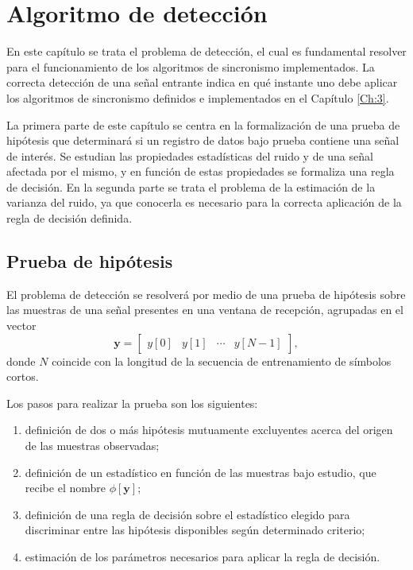\chapter{Algoritmo de detección}
\label{Ch:4}
\graphicspath{{figs/}}

En este capítulo se trata el problema de detección, el cual es fundamental resolver para el funcionamiento de los algoritmos de sincronismo implementados. La correcta detección de una señal entrante indica en qué instante uno debe \color{Green} aplicar \color{black} los algoritmos de sincronismo definidos e implementados en el Capítulo \ref{Ch:3}. 

La primera parte de este capítulo se centra en la formalización de una prueba de hipótesis que determinará si un registro de datos bajo prueba contiene una señal de interés. Se estudian las propiedades estadísticas del ruido y de una señal afectada por el mismo, y en función de estas propiedades se formaliza una regla de decisión. En la segunda parte se trata el problema de la estimación de la varianza del ruido, ya que conocerla es necesario para la correcta aplicación de la regla de decisión definida.

\section{Prueba de hipótesis}
\label{S:prueba-hipotesis}

El problema de detección se resolverá por medio de una prueba de hipótesis sobre las muestras de una señal presentes en una ventana de recepción, agrupadas en el vector
\begin{equation}\label{eq:def_y}
    \mathbf{y} = \begin{bmatrix}
        y[0] & y[1] & \cdots & y[N-1]
    \end{bmatrix},
\end{equation}
donde $N$ coincide con la longitud de la secuencia de entrenamiento de símbolos cortos. 

Los pasos para realizar la prueba son los siguientes:
\begin{enumerate}
    \item definición de dos o más hipótesis mutuamente excluyentes acerca del origen de las muestras observadas;
    \item definición de un estadístico en función de las muestras bajo estudio, que recibe el nombre $\phi\left[\mathbf{y}\right]$;
    \item definición de una regla de decisión sobre el estadístico elegido para discriminar entre las hipótesis disponibles según determinado criterio;
    \item estimación de los parámetros necesarios para aplicar la regla de decisión.
\end{enumerate}

